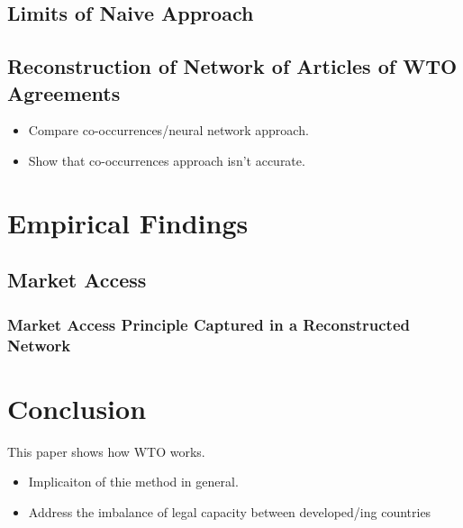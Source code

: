 \documentclass[12pt,letterpaper]{article}
\begin{document}


\subsection{Limits of Naive Approach}

\subsection{Reconstruction of Network of Articles of WTO Agreements}


\begin{itemize}
  \item Compare co-occurrences/neural network approach.

  \item Show that co-occurrences approach isn't accurate.
\end{itemize}


\section{Empirical Findings}


\subsection{Market Access}


\subsubsection{Market Access Principle Captured in a Reconstructed Network}


\section{Conclusion}
This paper shows how WTO works.

\begin{itemize}
  \item Implicaiton of thie method in general.
  \item Address the imbalance of legal capacity between developed/ing countries
\end{itemize}

\clearpage
\end{document}
